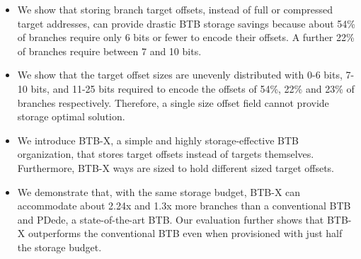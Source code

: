 \begin{itemize}
    \item We show that storing branch target offsets, instead of full or compressed target addresses, can provide drastic BTB storage savings because about 54\% of branches require only 6 bits or fewer to encode their offsets. A further 22\% of branches require between 7 and 10 bits. 
    \item We show that the target offset sizes are unevenly distributed with 0-6 bits, 7-10 bits, and 11-25 bits required to encode the offsets of 54\%, 22\% and 23\% of branches respectively. Therefore, a single size offset field cannot provide storage optimal solution.
    \item We introduce BTB-X, a simple and highly storage-effective BTB organization, that stores target offsets instead of targets themselves. Furthermore, BTB-X ways are sized to hold different sized target offsets.  
    \item We demonstrate that, with the same storage budget, BTB-X can accommodate about 2.24x and 1.3x more branches than a conventional BTB and PDede, a state-of-the-art BTB. Our evaluation further shows that BTB-X outperforms the conventional BTB even when provisioned with just half the storage budget.
\end{itemize}
